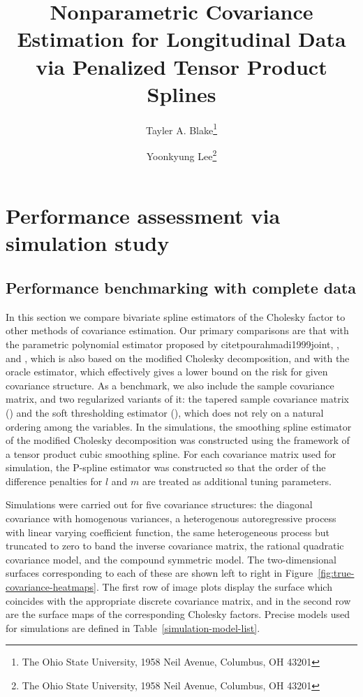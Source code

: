 \documentclass[12pt]{article}
\theoremstyle{definition}
\def\bL{\mathbf{L}}
\begin{document}
\def\bL{\mathbf{L}}



\title{ Nonparametric Covariance Estimation for Longitudinal Data via Penalized Tensor Product Splines}

\author{Tayler A. Blake\thanks{The Ohio State University, 1958 Neil Avenue, Columbus, OH 43201} \and  Yoonkyung Lee\thanks{The Ohio State University, 1958 Neil Avenue, Columbus, OH 43201}}


\maketitle

\section{Performance assessment via simulation study} 
\subsection{Performance benchmarking with complete data}

In this section we compare bivariate spline estimators of the Cholesky factor to other methods of covariance estimation. Our primary comparisons are that with the parametric polynomial estimator proposed by citet{pourahmadi1999joint},  \citet{pan2003modelling}, and \citet{pourahmadi2002dynamic}, which is also based on the modified Cholesky decomposition, and with the oracle estimator, which effectively gives a lower bound on the risk for given covariance structure. As a benchmark, we also include the sample covariance matrix, and two regularized variants of it: the tapered sample covariance matrix (\citet{cai2010optimal}) and the soft thresholding estimator (\citet{rothman2009generalized}), which does not rely on a natural ordering among the variables. In the simulations, the smoothing spline estimator of the modified Cholesky decomposition was constructed using the framework of a tensor product cubic smoothing spline. For each covariance matrix used for simulation, the P-spline estimator was constructed so that the order of the difference penalties for $l$ and $m$ are treated as additional tuning parameters.

\bigskip

Simulations were carried out for five covariance structures: the diagonal covariance with homogenous variances, a heterogenous autoregressive process with linear varying coefficient function, the same heterogeneous process but truncated to zero to band the inverse covariance matrix, the rational quadratic covariance model, and the compound symmetric model. The two-dimensional surfaces corresponding to each of these are shown left to right in Figure~\ref{fig:true-covariance-heatmaps}. The first row of image plots display the surface which coincides with the appropriate discrete covariance matrix, and in the second row are the surface maps of the corresponding Cholesky factors. Precise models used for simulations are defined in Table~\ref{simulation-model-list}.
\end{document}
